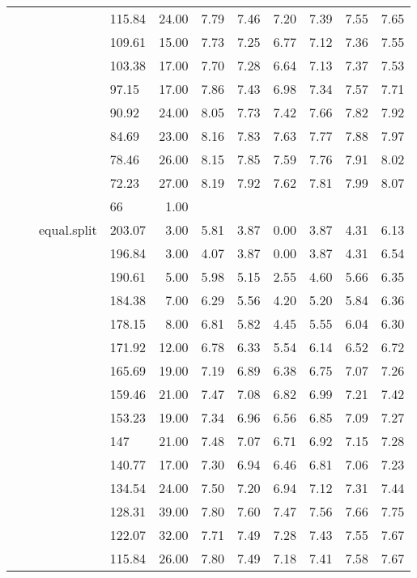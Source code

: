 \begin{longtable}{llllrrrrrrr}
   &  &  & 115.84 & 24.00 & 7.79 & 7.46 & 7.20 & 7.39 & 7.55 & 7.65 \\ 
   &  &  & 109.61 & 15.00 & 7.73 & 7.25 & 6.77 & 7.12 & 7.36 & 7.55 \\ 
   &  &  & 103.38 & 17.00 & 7.70 & 7.28 & 6.64 & 7.13 & 7.37 & 7.53 \\ 
   &  &  & 97.15 & 17.00 & 7.86 & 7.43 & 6.98 & 7.34 & 7.57 & 7.71 \\ 
   &  &  & 90.92 & 24.00 & 8.05 & 7.73 & 7.42 & 7.66 & 7.82 & 7.92 \\ 
   &  &  & 84.69 & 23.00 & 8.16 & 7.83 & 7.63 & 7.77 & 7.88 & 7.97 \\ 
   &  &  & 78.46 & 26.00 & 8.15 & 7.85 & 7.59 & 7.76 & 7.91 & 8.02 \\ 
   &  &  & 72.23 & 27.00 & 8.19 & 7.92 & 7.62 & 7.81 & 7.99 & 8.07 \\ 
   &  &  & 66 & 1.00 &  &  &  &  &  &  \\ 
   &  & equal.split & 203.07 & 3.00 & 5.81 & 3.87 & 0.00 & 3.87 & 4.31 & 6.13 \\ 
   &  &  & 196.84 & 3.00 & 4.07 & 3.87 & 0.00 & 3.87 & 4.31 & 6.54 \\ 
   &  &  & 190.61 & 5.00 & 5.98 & 5.15 & 2.55 & 4.60 & 5.66 & 6.35 \\ 
   &  &  & 184.38 & 7.00 & 6.29 & 5.56 & 4.20 & 5.20 & 5.84 & 6.36 \\ 
   &  &  & 178.15 & 8.00 & 6.81 & 5.82 & 4.45 & 5.55 & 6.04 & 6.30 \\ 
   &  &  & 171.92 & 12.00 & 6.78 & 6.33 & 5.54 & 6.14 & 6.52 & 6.72 \\ 
   &  &  & 165.69 & 19.00 & 7.19 & 6.89 & 6.38 & 6.75 & 7.07 & 7.26 \\ 
   &  &  & 159.46 & 21.00 & 7.47 & 7.08 & 6.82 & 6.99 & 7.21 & 7.42 \\ 
   &  &  & 153.23 & 19.00 & 7.34 & 6.96 & 6.56 & 6.85 & 7.09 & 7.27 \\ 
   &  &  & 147 & 21.00 & 7.48 & 7.07 & 6.71 & 6.92 & 7.15 & 7.28 \\ 
   &  &  & 140.77 & 17.00 & 7.30 & 6.94 & 6.46 & 6.81 & 7.06 & 7.23 \\ 
   &  &  & 134.54 & 24.00 & 7.50 & 7.20 & 6.94 & 7.12 & 7.31 & 7.44 \\ 
   &  &  & 128.31 & 39.00 & 7.80 & 7.60 & 7.47 & 7.56 & 7.66 & 7.75 \\ 
   &  &  & 122.07 & 32.00 & 7.71 & 7.49 & 7.28 & 7.43 & 7.55 & 7.67 \\ 
   &  &  & 115.84 & 26.00 & 7.80 & 7.49 & 7.18 & 7.41 & 7.58 & 7.67 \\ 

\end{longtable}
